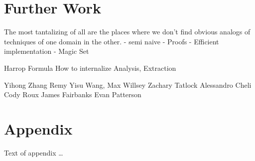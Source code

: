 \documentclass[sigplan,10pt,review,anonymous]{acmart}
\begin{document}
\section{Further Work}
The most tantalizing of all are the places where we don't find obvious analogs of techniques of one domain in the other.
- semi naive
- Proofs
- Efficient implementation
- Magic Set

Harrop Formula
How to internalize Analysis, Extraction

\begin{acks}                            %
  Yihong Zhang
Remy Yisu Wang,
Max Willsey
Zachary Tatlock
Alessandro Cheli
Cody Roux
James Fairbanks
Evan Patterson
\end{acks}


%


\appendix
\section{Appendix}

Text of appendix \ldots
\end{document}
